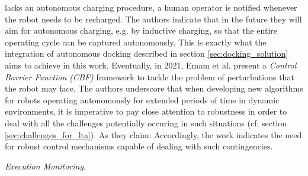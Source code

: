 \documentclass[english, master, utf8]{base/thesis_KBS}
\begin{document}
lacks an autonomous charging procedure, a human operator is notified whenever the robot needs to be recharged. The authors indicate that in the future they will aim for autonomous
charging, e.g. by inductive charging, so that the entire operating cycle can be captured autonomously. This is exactly what the integration of autonomous docking described in section
\ref{sec:docking_solution} aims to achieve in this work.\newline
Eventually, in 2021, Emam et al. \cite{Emam:2021} present a \textit{Control Barrier Function (CBF)} framework to tackle the problem of perturbations that the robot may face. The authors
underscore that when developing new algorithms for robots operating autonomously for extended periods of time in dynamic environments, it is imperative to pay close attention to
robustness in order to deal with all the challenges potentially occuring in such situations (cf. section \ref{sec:challenges_for_lta}). As they claim:
\cite{Emam:2021} Accordingly, the work indicates the need for robust control mechanisms capable of dealing with such contingencies.\newline

\noindent
\textit{Execution Monitoring.}\newline
\end{document}
